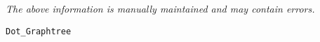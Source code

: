 \label{pkg:dot\_graphtree}

{\tiny \it The above information is manually maintained and may contain errors.}
\begin{verbatim}
Dot_Graphtree
\end{verbatim}
